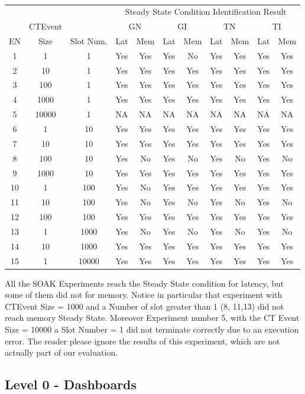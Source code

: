 \begin{table}[htb]
\centering
\scriptsize
 \begin{tabular}{c|c|c|cc|cc|cc|cc}
	  	\hline
	  	&&&\multicolumn{8}{c}{Steady State Condition Identification Result}  \\
	  	&CTEvent&&\multicolumn{2}{c}{GN}|&\multicolumn{2}{c}{GI}|&\multicolumn{2}{c}{TN}|&\multicolumn{2}{c}{TI}  \\
	  	EN&Size& Slot Num.&Lat&Mem&Lat&Mem&Lat&Mem&Lat&Mem  \\
		\hline
		\hline
		 1&1&1&Yes&Yes&Yes&No&Yes&Yes&Yes&Yes\\
		 2&10&1&Yes&Yes&Yes&Yes&Yes&Yes&Yes&Yes\\
		 3&100&1&Yes&Yes&Yes&Yes&Yes&Yes&Yes&Yes\\
		 4&1000&1&Yes&Yes&Yes&Yes&Yes&Yes&Yes&Yes\\
		 5&10000&1&NA&NA&NA&NA&NA&NA&NA&NA\\
		 6&1&10&Yes&Yes&Yes&Yes&Yes&Yes&Yes&Yes\\
		 7&10&10&Yes&Yes&Yes&Yes&Yes&Yes&Yes&Yes\\
		 8&100&10&Yes&No&Yes&No&Yes&No&Yes&No\\
		 9&1000&10&Yes&Yes&Yes&Yes&Yes&Yes&Yes&Yes\\
		 10&1&100&Yes&No&Yes&Yes&Yes&Yes&Yes&Yes\\
		 11&10&100&Yes&No&Yes&No&Yes&No&Yes&No\\
		 12&100&100&Yes&Yes&Yes&Yes&Yes&Yes&Yes&Yes\\
		 13&1&1000&Yes&No&Yes&No&Yes&No&Yes&No\\
		 14&10&1000&Yes&Yes&Yes&Yes&Yes&Yes&Yes&Yes\\
		 15&1&10000&Yes&Yes&Yes&Yes&Yes&Yes&Yes&Yes\\

		\hline 
 \end{tabular}
 \caption{}
\label{tab:ss-cond}
\end{table}

All the SOAK Experiments reach the Steady State condition for latency, but some of them did not for memory. Notice in particular that experiment with CTEvent Size = 1000 and a Number of slot greater than 1 (8, 11,13) did not reach memory Steady State. Moreover Experiment number 5,  with the CT Event Size = 10000 a Slot Number = 1 did not terminate correctly due to an execution error. The reader please ignore the results of this experiment, which are not actually part of our evaluation.

\subsection{Level 0 - Dashboards}\label{sec:eval-level0}

